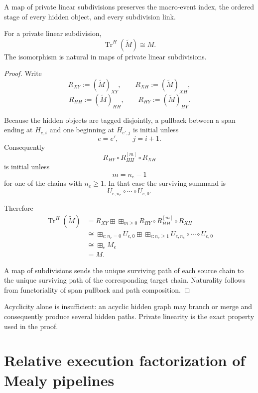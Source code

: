 A map of private linear subdivisions preserves the macro-event index, the ordered stage of every
hidden object, and every subdivision link.

\begin{theorem}
\label{thm:finite-subdivision-collapse}
For a private linear subdivision,
\[
  \operatorname{Tr}^{H}(\widetilde M)
  \cong
  M.
\]
The isomorphism is natural in maps of private linear subdivisions.
\end{theorem}

\begin{proof}
Write
\[
  R_{XY}:=(\widetilde M)_{XY},
  \qquad
  R_{XH}:=(\widetilde M)_{XH},
\]
\[
  R_{HH}:=(\widetilde M)_{HH},
  \qquad
  R_{HY}:=(\widetilde M)_{HY}.
\]

Because the hidden objects are tagged disjointly, a pullback between a span ending at \(H_{e,i}\)
and one beginning at \(H_{e',j}\) is initial unless
\[
  e=e',
  \qquad
  j=i+1.
\]
Consequently
\[
  R_{HY}\circ R_{HH}^{[m]}\circ R_{XH}
\]
is initial unless
\[
  m=n_e-1
\]
for one of the chains with \(n_e\geq1\). In that case the surviving summand is
\[
  U_{e,n_e}\circ\cdots\circ U_{e,0}.
\]

Therefore
\[
\begin{aligned}
  \operatorname{Tr}^{H}(\widetilde M)
  &=
  R_{XY}
  \boxplus
  \boxplus_{m\geq0}
  R_{HY}\circ R_{HH}^{[m]}\circ R_{XH}
  \\
  &\cong
  \boxplus_{e:n_e=0}U_{e,0}
  \boxplus
  \boxplus_{e:n_e\geq1}
  U_{e,n_e}\circ\cdots\circ U_{e,0}
  \\
  &\cong
  \boxplus_eM_e
  \\
  &=M.
\end{aligned}
\]

A map of subdivisions sends the unique surviving path of each source chain to the unique surviving
path of the corresponding target chain. Naturality follows from functoriality of span pullback and
path composition.
\end{proof}

Acyclicity alone is insufficient: an acyclic hidden graph may branch or merge and consequently
produce several hidden paths. Private linearity is the exact property used in the proof.

\section{Relative execution factorization of Mealy pipelines}
\label{sec:relative-execution-factorization}

